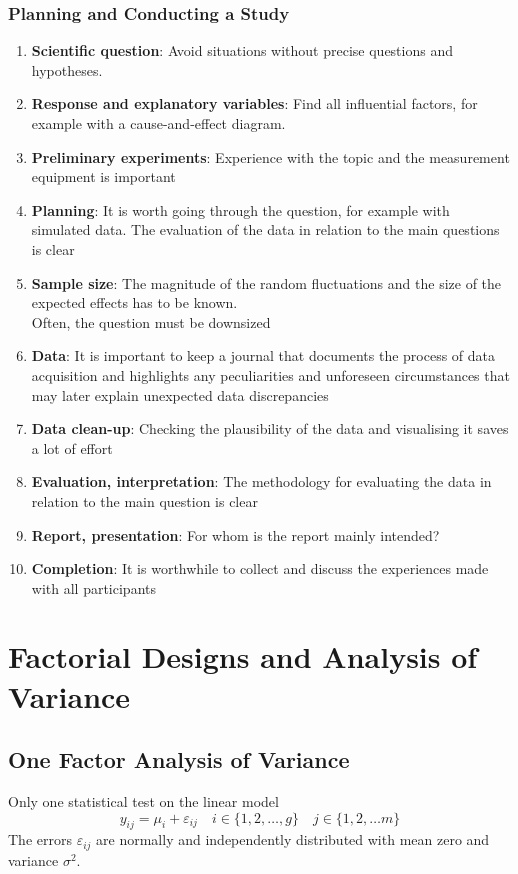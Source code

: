 \documentclass[11pt]{article}
\theoremstyle{definition}
\begin{document}
\subsubsection{Planning and Conducting a Study}
\begin{enumerate}
	\item \textbf{Scientific question}: Avoid situations without precise questions and hypotheses.
	\item \textbf{Response and explanatory variables}: Find all influential factors, for example with a cause-and-effect diagram.
	\item \textbf{Preliminary experiments}: Experience with the topic and the measurement equipment is important
	\item \textbf{Planning}: It is worth going through the question, for example with simulated data. The evaluation of the data in relation to the main questions is clear
	\item \textbf{Sample size}: The magnitude of the random fluctuations and the size of the expected effects has to be known.\\ Often, the question must be downsized
	\item \textbf{Data}: It is important to keep a journal that documents the process of data acquisition and highlights any peculiarities and unforeseen circumstances that may later explain unexpected data discrepancies
	\item \textbf{Data clean-up}: Checking the plausibility of the data and visualising it saves a lot of effort
	\item \textbf{Evaluation, interpretation}: The methodology for evaluating the data in relation to the main question is clear
	\item \textbf{Report, presentation}: For whom is the report mainly intended?
	\item \textbf{Completion}: It is worthwhile to collect and discuss the experiences made with all participants
\end{enumerate}

\section{Factorial Designs and Analysis of Variance}
\subsection{One Factor Analysis of Variance}
Only one statistical test on the linear model
\begin{equation*}
	y_{ij} = \mu_i + \varepsilon_{ij}\quad i\in\{1,2,\dots,g\}\quad j\in\{1,2,\dots m\}
\end{equation*}
The errors $\varepsilon_{ij}$ are normally and independently distributed with mean zero and variance $\sigma^2$.
\end{document}
